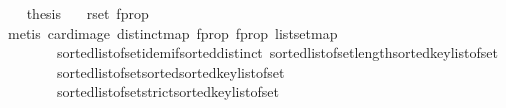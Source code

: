 \begin{isabellebody}
\ \ \isamarkupfalse%
\ {\isacharquery}{\kern0pt}thesis\ \isamarkupfalse%
\ {}\ rset\ f{\isacharunderscore}{\kern0pt}prop{}{}\isanewline
\ \ \ \ \isamarkupfalse%
\ {\isacharparenleft}{\kern0pt}metis\ card{\isacharunderscore}{\kern0pt}image\ distinct{\isacharunderscore}{\kern0pt}map\ f{\isacharunderscore}{\kern0pt}prop{}{}\ f{\isacharunderscore}{\kern0pt}prop{}\ list{\isachardot}{\kern0pt}set{\isacharunderscore}{\kern0pt}map\isanewline
\ \ \ \ \ \ \ \ sorted{\isacharunderscore}{\kern0pt}list{\isacharunderscore}{\kern0pt}of{\isacharunderscore}{\kern0pt}set{\isachardot}{\kern0pt}idem{\isacharunderscore}{\kern0pt}if{\isacharunderscore}{\kern0pt}sorted{\isacharunderscore}{\kern0pt}distinct\ sorted{\isacharunderscore}{\kern0pt}list{\isacharunderscore}{\kern0pt}of{\isacharunderscore}{\kern0pt}set{\isachardot}{\kern0pt}length{\isacharunderscore}{\kern0pt}sorted{\isacharunderscore}{\kern0pt}key{\isacharunderscore}{\kern0pt}list{\isacharunderscore}{\kern0pt}of{\isacharunderscore}{\kern0pt}set\isanewline
\ \ \ \ \ \ \ \ sorted{\isacharunderscore}{\kern0pt}list{\isacharunderscore}{\kern0pt}of{\isacharunderscore}{\kern0pt}set{\isachardot}{\kern0pt}sorted{\isacharunderscore}{\kern0pt}sorted{\isacharunderscore}{\kern0pt}key{\isacharunderscore}{\kern0pt}list{\isacharunderscore}{\kern0pt}of{\isacharunderscore}{\kern0pt}set\isanewline
\ \ \ \ \ \ \ \ sorted{\isacharunderscore}{\kern0pt}list{\isacharunderscore}{\kern0pt}of{\isacharunderscore}{\kern0pt}set{\isachardot}{\kern0pt}strict{\isacharunderscore}{\kern0pt}sorted{\isacharunderscore}{\kern0pt}key{\isacharunderscore}{\kern0pt}list{\isacharunderscore}{\kern0pt}of{\isacharunderscore}{\kern0pt}set{\isacharparenright}{\kern0pt}\isanewline
{}\isamarkupfalse%
%
\endisatagproof
{\isafoldproof}%
%
\isadelimproof
\isanewline
%
\endisadelimproof
%
\isadelimtheory
\isanewline
%
\endisadelimtheory
%
\isatagtheory
{}\isamarkupfalse%
%
\endisatagtheory
{\isafoldtheory}%
%
\isadelimtheory
%
\endisadelimtheory
%
\end{isabellebody}%
\endinput

